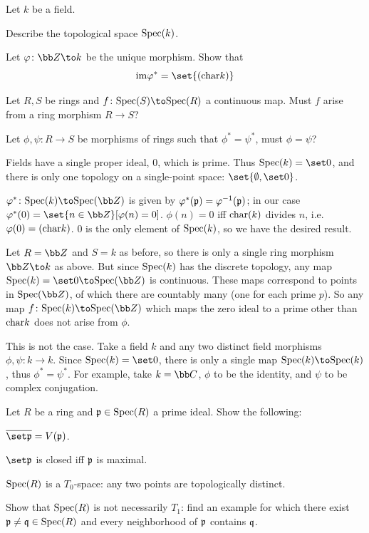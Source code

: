\bprob

    \benum
        \item Let $k$ be a field.
        \benum
            \item Describe the topological space ${\rm Spec}(k)$.
            \item Let $\phi\colon\bZ\to k$ be the unique morphism.
            Show that
            $$ \im\phi^* = \set{(\chr k)} $$
        \eenum
        \item Let $R,S$ be rings and $f\colon\spec(S)\to\spec(R)$ a continuous map.
        Must $f$ arise from a ring morphism $R\to S$?
        \item Let $\phi,\psi\colon R\to S$ be morphisms of rings such that $\phi^*=\psi^*$, must $\phi=\psi$?
    \eenum

\eprob

\benum
    \item
    \benum
        \item Fields have a single proper ideal, $0$, which is prime.
        Thus $\spec(k)=\set0$, and there is only one topology on a single-point space: $\set{\emptyset,\set0}$.
        \item $\phi^*\colon\spec(k)\to\spec(\bZ)$ is given by $\varphi^*({{\frak p}})=\varphi^{-1}({{\frak p}})$; in our case
        $\phi^*(0)=\set{n\in\bZ}[\phi(n)=0]$.
        $\phi(n)=0$ iff ${\rm char}(k)$ divides $n$, i.e.\ $\varphi(0)=({\rm char} k)$.
        $0$ is the only element of ${\rm Spec}(k)$, so we have the desired result.
    \eenum

    \item Let $R=\bZ$ and $S=k$ as before, so there is only a single ring morphism $\bZ\to k$ as above.
    But since ${\rm Spec}(k)$ has the discrete topology, any map $\spec(k)=\set0\to\spec(\bZ)$ is continuous.
    These maps correspond to points in $\spec(\bZ)$, of which there are countably many (one for each prime $p$).
    So any map $f\colon\spec(k)\to\spec(\bZ)$ which maps the zero ideal to a prime other than ${\rm char} k$ does not arise
    from $\phi$.

    \item This is not the case.
    Take a field $k$ and any two distinct field morphisms $\phi,\psi\colon k\to k$.
    Since $\spec(k)=\set0$, there is only a single map $\spec(k)\to\spec(k)$, thus $\phi^*=\psi^*$.
    For example, take $k=\bC$, $\phi$ to be the identity, and $\psi$ to be complex conjugation.
\eenum

\bprob

    Let $R$ be a ring and ${{\frak p}}\in{\rm Spec}(R)$ a prime ideal.
    Show the following:
    \benum
        \item $\cl{\set\p}=V(\p)$.
        \item $\set\p$ is closed iff ${{\frak p}}$ is maximal.
        \item ${\rm Spec}(R)$ is a $T_0$-space: any two points are topologically distinct.
        \item Show that ${\rm Spec}(R)$ is not necessarily $T_1$: find an example for which there exist ${{\frak p}}\neq{{\frak q}}\in{\rm Spec}(R)$
        and every neighborhood of ${{\frak p}}$ contains ${{\frak q}}$.
    \eenum

